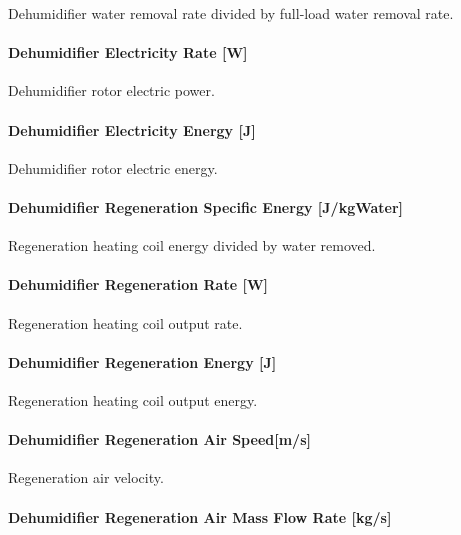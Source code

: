 Dehumidifier water removal rate divided by full-load water removal rate.

\paragraph{Dehumidifier Electricity Rate {[}W{]}}\label{dehumidifier-electric-power-w}

Dehumidifier rotor electric power.

\paragraph{Dehumidifier Electricity Energy {[}J{]}}\label{dehumidifier-electric-energy-j}

Dehumidifier rotor electric energy.

\paragraph{Dehumidifier Regeneration Specific Energy {[}J/kgWater{]}}\label{dehumidifier-regeneration-specific-energy-jkgwater}

Regeneration heating coil energy divided by water removed.

\paragraph{Dehumidifier Regeneration Rate {[}W{]}}\label{dehumidifier-regeneration-rate-w}

Regeneration heating coil output rate.

\paragraph{Dehumidifier Regeneration Energy {[}J{]}}\label{dehumidifier-regeneration-energy-j}

Regeneration heating coil output energy.

\paragraph{Dehumidifier Regeneration Air Speed{[}m/s{]}}\label{dehumidifier-regeneration-air-speedms}

Regeneration air velocity.

\paragraph{Dehumidifier Regeneration Air Mass Flow Rate {[}kg/s{]}}\label{dehumidifier-regeneration-air-mass-flow-rate-kgs}

